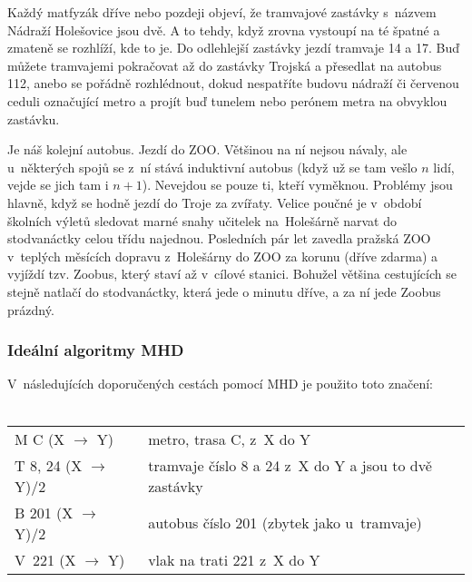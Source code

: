 Každý matfyzák dříve nebo pozdeji objeví, že tramvajové zastávky s~názvem Nádraží Holešovice jsou dvě. A to tehdy, když zrovna vystoupí na té špatné a zmateně se rozhlíží, kde to je. Do odlehlejší zastávky jezdí tramvaje 14 a 17. Buď můžete tramvajemi pokračovat až do zastávky Trojská a přesedlat na autobus 112, anebo se pořádně rozhlédnout, dokud nespatříte budovu nádraží či červenou ceduli označující metro a projít buď tunelem nebo perónem metra na obvyklou zastávku.

Je náš kolejní autobus. Jezdí do ZOO. Většinou na ní nejsou
návaly, ale u~některých spojů se z~ní stává induktivní autobus
(když už se tam vešlo $n$ lidí, vejde se jich tam i $n+1$).
Nevejdou se pouze ti, kteří vyměknou. Problémy jsou hlavně, když
se hodně jezdí do Troje za zvířaty. Velice poučné je v~období
školních výletů sledovat marné snahy učitelek na~Holešárně narvat
do stodvanáctky celou třídu najednou. Posledních pár let zavedla
pražská ZOO v~teplých měsících dopravu z~Holešárny do ZOO za
korunu (dříve zdarma) a vyjíždí tzv. Zoobus, který staví až
v~cílové stanici. Bohužel většina cestujících se stejně natlačí do
stodvanáctky, která jede o minutu dříve, a za ní jede Zoobus
prázdný.

\subsubsection{Ideální algoritmy MHD}

\def\startpath{B 112, M C (Nádrhol \ra }
\def\ra{$\rightarrow$}

V~následujících doporučených cestách pomocí MHD je použito toto
značení:
\\\\
\noindent\begin{tabularx}{\textwidth}{ l X }
     M C (X $\rightarrow$ Y) & metro,  trasa C, z~X do Y \\ 
     T 8, 24 (X $\rightarrow$ Y)/2 & tramvaje číslo 8 a 24 z~X do Y a jsou to dvě zastávky \\
      B 201 (X $\rightarrow$ Y)/2 &  autobus číslo 201 (zbytek jako u~tramvaje)\\
      V~221 (X $\rightarrow$ Y) & vlak na trati 221 z~X do Y
\end{tabularx}
\smallskip

